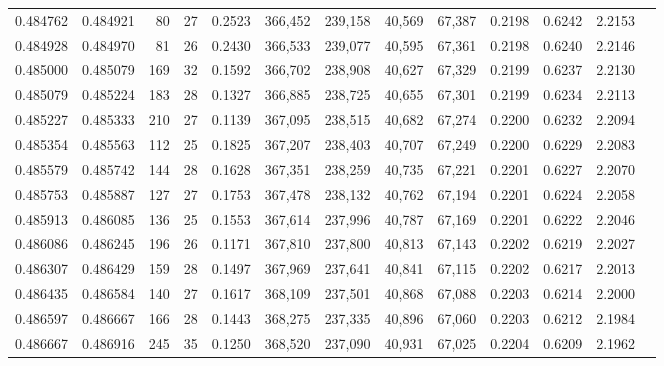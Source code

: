 \begin{tabular}{rrrrrrrrrrrrr}
0.484762 & 0.484921 &     80 &    27 &                                     0.2523 & 366,452 & 239,158 &  40,569 &  67,387 & 0.2198 & 0.6242 & 2.2153 \\
0.484928 & 0.484970 &     81 &    26 &                                     0.2430 & 366,533 & 239,077 &  40,595 &  67,361 & 0.2198 & 0.6240 & 2.2146 \\
0.485000 & 0.485079 &    169 &    32 &                                     0.1592 & 366,702 & 238,908 &  40,627 &  67,329 & 0.2199 & 0.6237 & 2.2130 \\
0.485079 & 0.485224 &    183 &    28 &                                     0.1327 & 366,885 & 238,725 &  40,655 &  67,301 & 0.2199 & 0.6234 & 2.2113 \\
0.485227 & 0.485333 &    210 &    27 &                                     0.1139 & 367,095 & 238,515 &  40,682 &  67,274 & 0.2200 & 0.6232 & 2.2094 \\
0.485354 & 0.485563 &    112 &    25 &                                     0.1825 & 367,207 & 238,403 &  40,707 &  67,249 & 0.2200 & 0.6229 & 2.2083 \\
0.485579 & 0.485742 &    144 &    28 &                                     0.1628 & 367,351 & 238,259 &  40,735 &  67,221 & 0.2201 & 0.6227 & 2.2070 \\
0.485753 & 0.485887 &    127 &    27 &                                     0.1753 & 367,478 & 238,132 &  40,762 &  67,194 & 0.2201 & 0.6224 & 2.2058 \\
0.485913 & 0.486085 &    136 &    25 &                                     0.1553 & 367,614 & 237,996 &  40,787 &  67,169 & 0.2201 & 0.6222 & 2.2046 \\
0.486086 & 0.486245 &    196 &    26 &                                     0.1171 & 367,810 & 237,800 &  40,813 &  67,143 & 0.2202 & 0.6219 & 2.2027 \\
0.486307 & 0.486429 &    159 &    28 &                                     0.1497 & 367,969 & 237,641 &  40,841 &  67,115 & 0.2202 & 0.6217 & 2.2013 \\
0.486435 & 0.486584 &    140 &    27 &                                     0.1617 & 368,109 & 237,501 &  40,868 &  67,088 & 0.2203 & 0.6214 & 2.2000 \\
0.486597 & 0.486667 &    166 &    28 &                                     0.1443 & 368,275 & 237,335 &  40,896 &  67,060 & 0.2203 & 0.6212 & 2.1984 \\
0.486667 & 0.486916 &    245 &    35 &                                     0.1250 & 368,520 & 237,090 &  40,931 &  67,025 & 0.2204 & 0.6209 & 2.1962 \\

\end{tabular}
